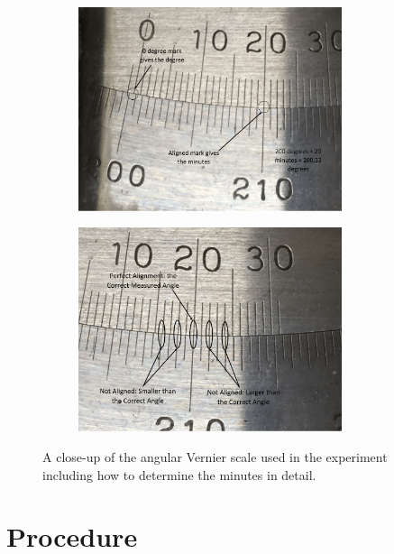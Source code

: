 \begin{figure}
\centering
\begin{subfigure}[b]{\textwidth}
  \includegraphics[width=0.85\textwidth]{./Exp9/pic/vernierexample1.png}
\end{subfigure}

\begin{subfigure}[b]{\textwidth}
  \includegraphics[width=0.85\textwidth]{./Exp9/pic/vernierexample2.png}
\end{subfigure}
\caption{A close-up of the angular Vernier scale used in the experiment including how to determine the minutes in detail.}
\end{figure}

\newpage

\section{Procedure}

